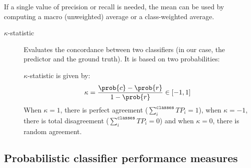 If a single value of precision or recall is needed, the mean can be used by computing
a macro (unweighted) average or a class-weighted average.

\begin{description}
    \item[$\kappa$-statistic] 
        Evaluates the concordance between two classifiers (in our case, the predictor and the ground truth).
        It is based on two probabilities:

        $\kappa$-statistic is given by:
        \[ \kappa = \frac{\prob{c} - \prob{r}}{1 - \prob{r}} \in [-1, 1] \]
        When $\kappa = 1$, there is perfect agreement ($\sum_{i}^{\texttt{classes}} TP_i = 1$), 
        when $\kappa = -1$, there is total disagreement ($\sum_{i}^{\texttt{classes}} TP_i = 0$) and
        when $\kappa = 0$, there is random agreement.
\end{description}


\subsection{Probabilistic classifier performance measures}


